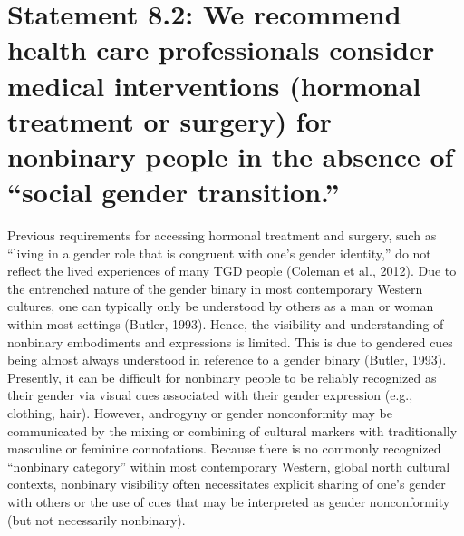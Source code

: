 \documentclass[
]{book}
\begin{document}
\hypertarget{statement-8.2-we-recommend-health-care-professionals-consider-medical-interventions-hormonal-treatment-or-surgery-for-nonbinary-people-in-the-absence-of-social-gender-transition.}{%
\section*{Statement 8.2: We recommend health care professionals consider medical interventions (hormonal treatment or surgery) for nonbinary people in the absence of ``social gender transition.''}\label{statement-8.2-we-recommend-health-care-professionals-consider-medical-interventions-hormonal-treatment-or-surgery-for-nonbinary-people-in-the-absence-of-social-gender-transition.}}

Previous requirements for accessing hormonal
treatment and surgery, such as ``living in a gender
role that is congruent with one's gender identity,''
do not reflect the lived experiences of many TGD
people (Coleman et al., 2012). Due to the entrenched
nature of the gender binary in most contemporary
Western cultures, one can typically only be understood by others as a man or woman within most
settings (Butler, 1993). Hence, the visibility and
understanding of nonbinary embodiments and
expressions is limited. This is due to gendered cues
being almost always understood in reference to a
gender binary (Butler, 1993). Presently, it can be
difficult for nonbinary people to be reliably recognized as their gender via visual cues associated with
their gender expression (e.g., clothing, hair).
However, androgyny or gender nonconformity may
be communicated by the mixing or combining of
cultural markers with traditionally masculine or
feminine connotations. Because there is no commonly recognized ``nonbinary category'' within most
contemporary Western, global north cultural contexts, nonbinary visibility often necessitates explicit
sharing of one's gender with others or the use of
cues that may be interpreted as gender nonconformity (but not necessarily nonbinary).
\end{document}
